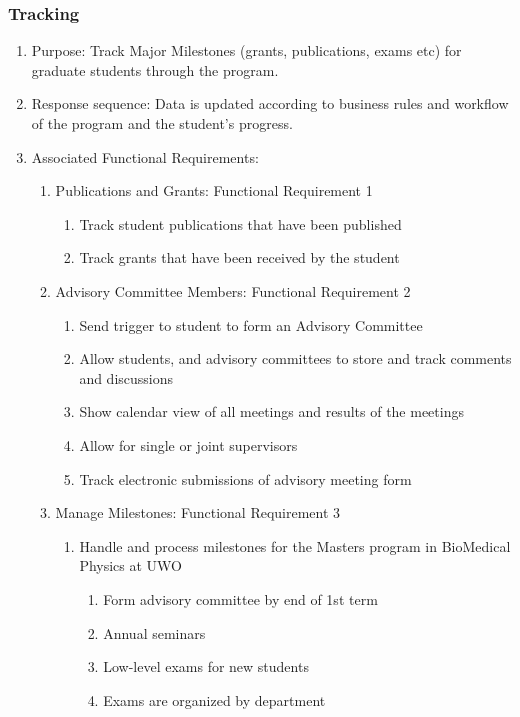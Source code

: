 \documentclass{journal}
\begin{document}
				\subsubsection{Tracking}
				\begin{enumerate}
				\item Purpose: Track Major Milestones (grants, publications, exams etc) for graduate students through the program.
				\item Response sequence: Data is updated according to business rules and workflow of the program and the student's progress.
				\item Associated Functional Requirements:
				\begin{enumerate}
				\item Publications and Grants: Functional Requirement 1
				\begin{enumerate}
				\item Track student publications that have been published 
				\item Track grants that have been received by the student
				\end{enumerate}
				\item Advisory Committee Members: Functional Requirement 2
				\begin{enumerate}
				\item Send trigger to student to form an Advisory Committee
				\item Allow students, and advisory committees to store and track comments and discussions
				\item Show calendar view of all meetings and results of the meetings
				\item Allow for single or joint supervisors 
				\item Track electronic submissions of advisory meeting form
				\end{enumerate}
				\item Manage Milestones: Functional Requirement 3
				\begin{enumerate}
				\item Handle and process milestones for the Masters program in BioMedical Physics at UWO
				\begin{enumerate}
				\item Form advisory committee by end of 1st term
				\item Annual seminars 
				\item Low-level exams for new students
				\item Exams are organized by department

\end{enumerate}
\end{enumerate}
\end{enumerate}
\end{enumerate}
\end{document}
